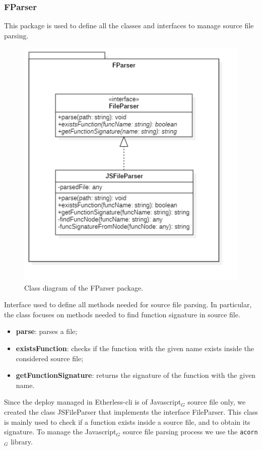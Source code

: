 		\subsubsection{FParser}
 		This package is used to define all the classes and interfaces to manage source file parsing.
		
		\begin{figure} [h!]
			\centering
			\includegraphics[width=0.5\linewidth]{diagrammi/etherless-cli/FParser}
			\caption{Class diagram of the FParser package.}
		\end{figure}
		
			Interface used to define all methods needed for source file parsing. In particular, the class focuses on methods needed to find function signature in source file. 
		
					\begin{itemize}
						\item \textbf{parse}: parses a file;   
						\item \textbf{existsFunction}: checks if the function with the given name exists inside the considered source file;
						\item \textbf{getFunctionSignature}: returns the signature of the function with the given name.
					\end{itemize}
		
			Since the deploy managed in Etherless-cli is of Javascript$_{G}$ source file only, we created the class JSFileParser that implements the interface FileParser. This class is mainly used to check if a function exists inside a source file, and to obtain its signature. To manage the Javascript$_{G}$ source file parsing process we use the \texttt{acorn}$_{G}$ library. 
			
